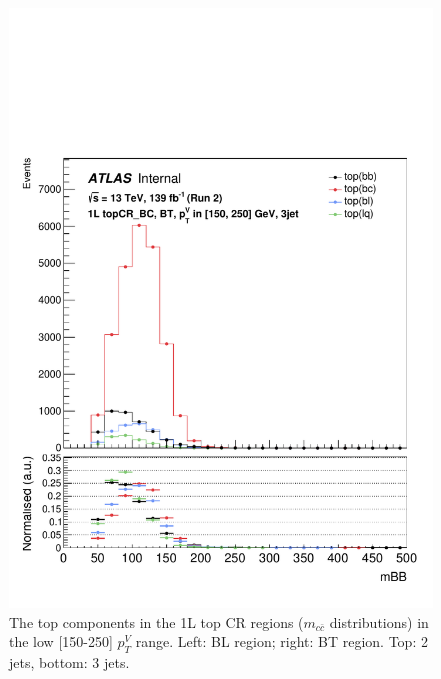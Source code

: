 \begin{figure}[h!]
\includegraphics[scale=0.253]{Images/VH/top/OneLepton_top_1bttag3jet_topCR_BC_150_250ptv_mBB.pdf}
\caption{The top components in the 1L top CR regions ($m_{c\bar{c}}$ distributions) in the low [150-250] $p_T^V$ range. Left: BL region; right: BT region. Top: 2 jets, bottom: 3 jets.} 
\label{fig:toptopCRslowptv}
\end{figure}

